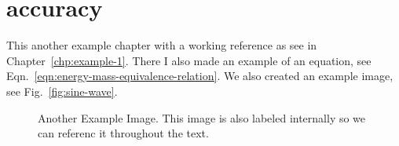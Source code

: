 \documentclass[\main/master.tex]{subfiles}
\begin{document}
\section{accuracy}
\doublespacing
\hspace{5 mm} This another example chapter with a working reference as see in Chapter~\ref{chp:example-1}. There I also made an example of an equation, see Eqn.~\ref{eqn:energy-mass-equivalence-relation}. We also created an example image, see Fig.~\ref{fig:sine-wave}.
\begin{figure}[htbp]
	\centering
	\caption[Another Example Image]{Another Example Image. This image is also labeled internally so we can referenc it throughout the text.}
	\label{fig:cosine-wave}
\end{figure}
\end{document}
